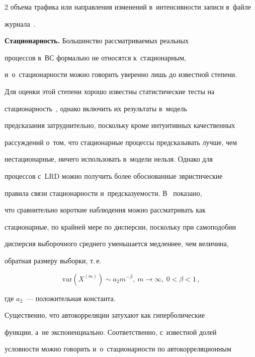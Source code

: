 \begin{multicols}{2}
объема трафика или направления изменений в~интенсивности записи в~файле 


журнала~\cite{14-fr}. 


  


\smallskip





  \textbf{Стационарность.} Большинство рас\-смат\-ри\-ва\-емых реальных 


процессов в~ВС формально не относятся к~стационарным, 


и~о~стационарности мож\-но говорить уверенно лишь до известной степени. 


Для оценки этой степени хорошо известны статистические тесты на 


стационарность~\cite{17-fr}, однако включить их результаты в~модель 


предсказания затруднительно, поскольку кроме интуитивных качественных 


рассуждений о~том, что стационарные процессы предсказывать лучше, чем 


нестационарные, ничего использовать в~модели нельзя. Однако для 


процессов с~LRD можно получить более обоснованные эвристические 


правила связи стационарности и~предсказуемости. В~\cite{15-fr} показано, 


что сравнительно короткие наблюдения можно рассматривать как 


стационарные, по крайней мере по дисперсии, поскольку при самоподобии 


дисперсия выборочного среднего уменьшается медленнее, чем величина, 


обратная размеру выборки, т.\,е.\


$$


\mathrm{var}\left(X^{(m)}\right) \sim a_2m^{-\beta},\ m \to \infty,\ 0<\beta < 1\,,


$$ 


где $a_2$~--- положительная константа.


  


  Существенно, что автокорреляции затухают как гиперболические 


функции, а~не экспоненциально. Соответственно, с~известной долей 


условности можно говорить и~о~стационарности по автокорреляционным 



\end{multicols}

